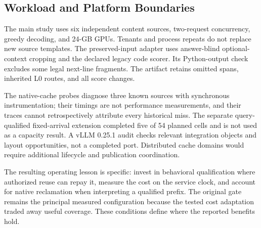 \subsection{Workload and Platform Boundaries}
The main study uses six independent content sources, two-request concurrency, greedy decoding, and 24-GB GPUs. Tenants and process repeats do not replace new source templates. The preserved-input adapter uses answer-blind optional-context cropping and the declared legacy code scorer. Its Python-output check excludes some legal next-line fragments. The artifact retains omitted spans, inherited L0 routes, and all score changes.

The native-cache probes diagnose three known sources with synchronous instrumentation; their timings are not performance measurements, and their traces cannot retrospectively attribute every historical miss. The separate query-qualified fixed-arrival extension completed five of 54 planned cells and is not used as a capacity result. A vLLM 0.25.1 audit checks relevant integration objects and layout opportunities, not a completed port. Distributed cache domains would require additional lifecycle and publication coordination.

The resulting operating lesson is specific: invest in behavioral qualification where authorized reuse can repay it, measure the cost on the service clock, and account for native reclamation when interpreting a qualified prefix. The original gate remains the principal measured configuration because the tested cost adaptation traded away useful coverage. These conditions define where the reported benefits hold.
